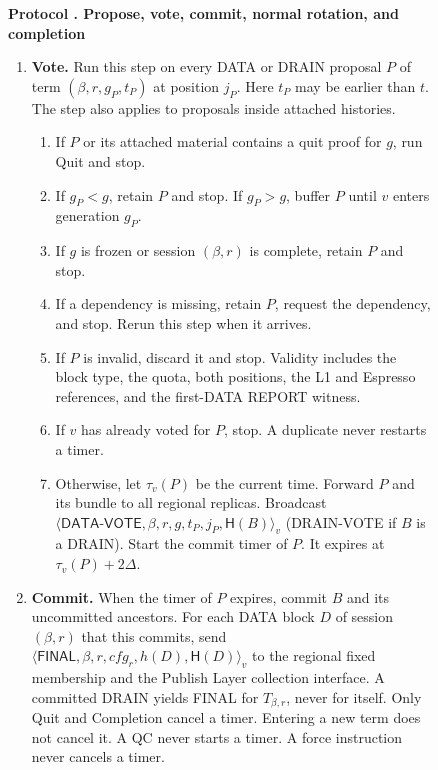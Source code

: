 \documentclass[11pt,a4paper]{article}
\newcommand{\RR}[1]{{\color{rrRed}#1}}
\newcommand{\Hash}{\mathsf H}
\newcommand{\tagg}[1]{\ensuremath{\mathsf{#1}}}
\newcounter{protocol}
\newenvironment{protocol}[3][htbp]{\begin{figure}[#1]\refstepcounter{protocol}\label{#2}
\begin{mdframed}[linewidth=.6pt,skipabove=0pt,skipbelow=0pt,
innertopmargin=7pt,innerbottommargin=7pt]\small
\textbf{Protocol \theprotocol. #3}\par\smallskip}{\end{mdframed}\end{figure}}
\begin{document}
\begin{protocol}{alg:steady}{Propose, vote, commit, normal rotation\RR{, and completion}}
\begin{enumerate}[label=\textbf{\arabic*)},itemsep=3pt]
\item \textbf{Vote.} Run this step on every DATA \RR{or DRAIN} proposal
$P$ of term $(\beta,r,g_P,t_P)$ at position $j_P$. Here $t_P$ may be earlier
than $t$. The step also applies to proposals inside attached histories.
 \begin{enumerate}[label=(\alph*)]
 \item If $P$ or its attached material contains a quit proof for $g$,
       run Quit and stop.
 \item If $g_P<g$, retain $P$ and stop. If $g_P>g$, buffer $P$
       until $v$ enters generation $g_P$.
 \item If $g$ is frozen \RR{or session $(\beta,r)$ is complete}, retain $P$ and
       stop.
 \item If a dependency is missing, retain $P$, request the dependency,
       and stop. Rerun this step when it arrives.
 \item If $P$ is invalid, discard it and stop. \RR{Validity includes the
       block type, the quota, both positions, the L1 and Espresso references,
       and the first-DATA REPORT witness.}
 \item If $v$ has already voted for $P$, stop.
       A duplicate never restarts a timer.
 \item Otherwise, let $\tau_v(P)$ be the current time. Forward $P$ and
       its bundle to all \RR{regional replicas. }
       Broadcast
       $\langle\tagg{DATA\mbox{-}VOTE},\beta,r,g,t_P,j_P,\Hash(B)\rangle_v$
       \RR{(DRAIN-VOTE if $B$ is a DRAIN)}.
       Start the commit timer of $P$. It expires at $\tau_v(P)+2\Delta$.
 \end{enumerate}

\item \textbf{Commit.} When the timer of $P$ expires, commit $B$ and
its uncommitted ancestors. \RR{For each DATA block $D$ of session $(\beta,r)$
that this commits, send
$\langle\tagg{FINAL},\beta,r,\mathit{cfg}_r,h(D),\Hash(D)\rangle_v$ to the regional fixed membership and the Publish Layer collection interface. A committed DRAIN yields FINAL for $T_{\beta,r}$, never for
itself. } Only Quit \RR{and Completion} cancel a timer. Entering a
new term does not cancel it. A QC never starts a timer. \RR{A force
instruction never cancels a timer.}


\end{enumerate}
\end{protocol}
\end{document}
